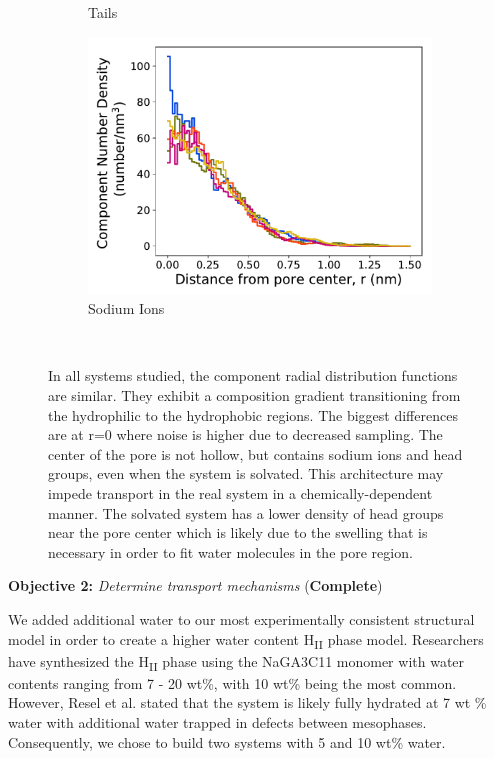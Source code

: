\documentclass{article}
\begin{document}
\begin{figure}[!htb]
\begin{subfigure}{0.32\textwidth}
        \caption{Tails}
        \label{fig:tails_regional_density}
  \end{subfigure}
  \begin{subfigure}{0.32\textwidth}
        \includegraphics[width=1\linewidth]{sodium_density.pdf}
        \caption{Sodium Ions}
        \label{fig:sodium_regional_density}
  \end{subfigure}
  \caption{In all systems studied, the component radial distribution functions are similar.
      They exhibit a composition gradient transitioning from the hydrophilic to the hydrophobic
          regions. The biggest differences are at r=0 where noise is higher due to
          decreased sampling. The center of the pore is not hollow, but contains sodium ions and
          head groups, even when the system is solvated. This architecture may impede transport in
          the real system in a chemically-dependent manner.
          The solvated system has a lower density of head groups near the
          pore center which is likely due to the swelling that is necessary in order to fit water
          molecules in the pore region.}~\label{fig:overlaid_densities}
  \vspace{-0.5cm}
  \end{figure}
  
  \noindent \textbf{\large Objective 2:} \textit{\large Determine transport mechanisms} (\textcolor{green!40!olive}{\textbf{Complete}})
  
  We added additional water to our most experimentally consistent structural
  model in order to create a higher water content H\textsubscript{II} phase
  model. Researchers have synthesized the H\textsubscript{II} phase using 
  the NaGA3C11 monomer with water contents ranging from 7 - 20 wt\%, with 
  10 wt\% being the most common.~\cite{smith_ordered_1997,zhou_supported_2005} 
  However, Resel et al. stated that the system is likely fully hydrated at
  7 wt \% water with additional water trapped in defects between mesophases.~\cite{resel_structural_2000}
  Consequently, we chose to build two systems with 5 and 10 wt\% water.
  
\end{document}
